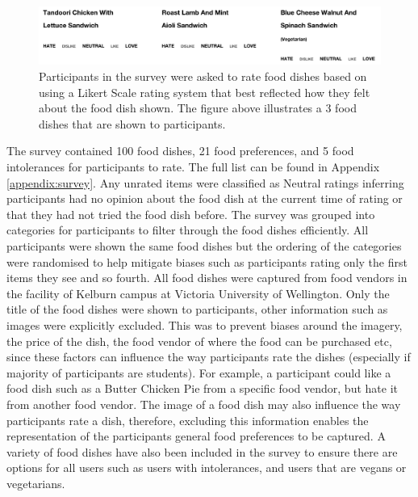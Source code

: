 \begin{figure}
\centering
\includegraphics[scale=0.5]{images/survey_foods.png}
\caption{Participants in the survey were asked to rate food dishes based on using a Likert Scale rating system that best reflected how they felt about the food dish shown. The figure above illustrates a 3 food dishes that are shown to participants.}
\label{fig:survey_food}
\end{figure}

The survey contained 100 food dishes, 21 food preferences, and 5 food intolerances for participants to rate. The full list can be found in Appendix \ref{appendix:survey}. Any unrated items were classified as Neutral ratings inferring participants had no opinion about the food dish at the current time of rating or that they had not tried the food dish before. The survey was grouped into categories for participants to filter through the food dishes efficiently. All participants were shown the same food dishes but the ordering of the categories were randomised to help mitigate biases such as participants rating only the first items they see and so fourth. All food dishes were captured from food vendors in the facility of Kelburn campus at Victoria University of Wellington. Only the title of the food dishes were shown to participants, other information such as images were explicitly excluded. This was to prevent biases around the imagery, the price of the dish, the food vendor of where the food can be purchased etc, since these factors can influence the way participants rate the dishes (especially if majority of participants are students). For example, a participant could like a food dish such as a Butter Chicken Pie from a specific food vendor, but hate it from another food vendor. The image of a food dish may also influence the way participants rate a dish, therefore, excluding this information enables the representation of the participants general food preferences to be captured. A variety of food dishes have also been included in the survey to ensure there are options for all users such as users with intolerances, and users that are vegans or vegetarians. 

